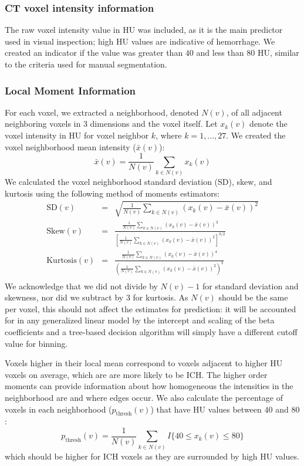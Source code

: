 \documentclass{elsarticle_nonatbib}\usepackage[]{graphicx}\usepackage[]{color}
\begin{document}
\subsubsection{CT voxel intensity information} The raw voxel intensity value in HU was included, as it is the main predictor used in visual inspection; high HU values are indicative of hemorrhage. We created an indicator if the value was greater than $40$ and less than $80$ HU, similar to the criteria used for manual segmentation. 

\subsubsection{Local Moment Information} For each voxel, we extracted a neighborhood, denoted $N(v)$, of all adjacent neighboring voxels in $3$ dimensions and the voxel itself.  Let $x_k(v)$ denote the voxel intensity in HU for voxel neighbor $k$, where $k = 1, \dots, 27$.  We created the voxel neighborhood mean intensity ($\bar{x}(v)$):
\begin{equation}
\bar{x}(v) = \frac{1}{N(v)} \sum_{k \in N(v)} x_k(v) \label{eq:mean}
\end{equation}
We calculated the voxel neighborhood standard deviation (SD), skew, and kurtosis using the following method of moments estimators:
\begin{eqnarray*}
\text{SD}(v) &=& \sqrt{ \frac{1}{N(v)} \sum_{k \in N(v)} \left(x_k(v) - \bar{x}(v)\right)^2 } \\
\text{Skew}(v) &=& \frac{ \frac{1}{N(v)} \sum\limits_{k \in N(v)} (x_k(v)-\bar{x}(v) )^3 } {\left[ \frac{1}{N(v)} \sum\limits_{k \in N(v)} (x_k(v)- \bar{x}(v))^2\right]^{3/2}} \\
\text{Kurtosis}(v) &=& \frac{ \frac{1}{N(v)} \sum\limits_{k \in N(v)} (x_k(v)-\bar{x}(v) )^4 }{ \left( \frac{1}{N(v)} \sum\limits_{k \in N(v)} \left(x_k(v) - \bar{x}(v)\right)^2\right)^2} \\
\label{eq:moment}
\end{eqnarray*}
We acknowledge that we did not divide by $N(v) - 1$ for standard deviation and skewness, nor did we subtract by $3$ for kurtosis.  As $N(v)$ should be the same per voxel, this should not affect the estimates for prediction: it will be accounted for in any generalized linear model by the intercept and scaling of the beta coefficients and a tree-based decision algorithm will simply have a different cutoff value for binning.

Voxels higher in their local mean correspond to voxels adjacent to higher HU voxels on average, which are are more likely to be ICH.  The higher order moments can provide information about how homogeneous the intensities in the neighborhood are and where edges occur.  We also calculate the percentage of voxels in each neighborhood ($p_{\text{thresh}}(v)$) that have HU values between $40$ and $80$:
\begin{equation}
p_{\text{thresh}}(v) = \frac{1}{N(v)} \sum_{k \in N(v)} I\{ 40 \leq x_k(v) \leq 80 \} \label{eq:pct}
\end{equation}
which should be higher for ICH voxels as they are surrounded by high HU values.  
\end{document}
